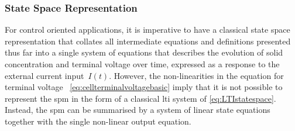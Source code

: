 \subsubsection*{State Space Representation}\label{subsec:basicspmstatespace}

For control  oriented applications, it is  imperative to have a  classical state
space representation  that collates  all intermediate equations  and definitions
presented  thus  far into  a  single  system  of  equations that  describes  the
evolution of solid concentration and terminal  voltage over time, expressed as a
response to the  external current input~$I(t)$. However,  the non-linearities in
the equation for terminal voltage \ie~\cref{eq:cellterminalvoltagebasic} imply
that it is  not possible to represent  the \gls{spm} in the form  of a classical
\gls{lti}  system  of \cref{eq:LTIstatespace}.  Instead,  the  \gls{spm} can  be
summarised  by a  system  of linear  state equations  together  with the  single
non-linear output equation.

